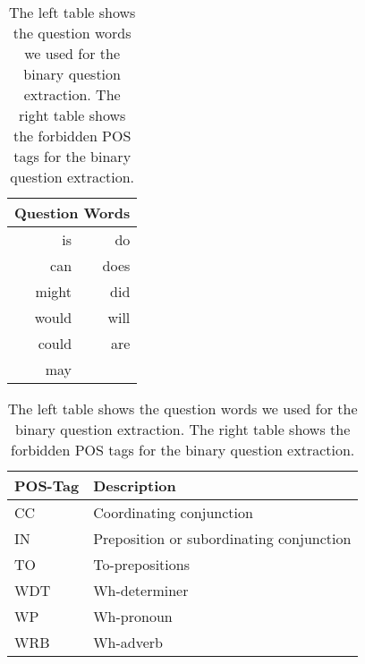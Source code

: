 \begin{table}
\caption{The left table shows the question words we used for the binary question
extraction. The right table shows the forbidden POS tags for the binary question extraction.}
\label{table-questions-pos-tags}
	\centering
	\begin{tabular}{rr}
		\toprule
		\multicolumn{2}{c}{\textbf{Question Words}} \\
		\midrule
		is & do\\
		can  & does\\
		might & did \\
		would & will \\
		could & are\\
		may \\
		\bottomrule
	\end{tabular}
	\quad
	\begin{tabular}{ll}
		\toprule
		\textbf{POS-Tag} & \textbf{Description}\\
		\midrule
		CC & Coordinating conjunction \\
		IN & Preposition or subordinating conjunction \\
		TO & To-prepositions \\
		WDT & Wh-determiner \\
		WP & Wh-pronoun \\
		WRB & Wh-adverb \\
		\bottomrule
	\end{tabular}
\end{table}